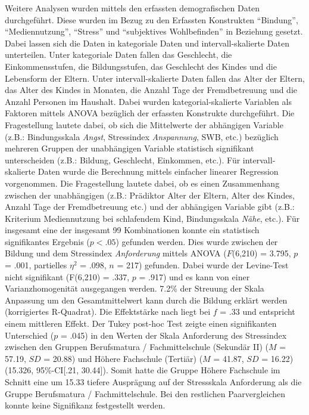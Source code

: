 Weitere Analysen wurden mittels den erfassten demografischen Daten durchgeführt. Diese wurden im Bezug zu den Erfassten Konstrukten \enquote{Bindung}, \enquote{Mediennutzung}, \enquote{Stress} und \enquote{subjektives Wohlbefinden} in Beziehung gesetzt. Dabei lassen sich die Daten in kategoriale Daten und intervall-skalierte Daten unterteilen. Unter kategoriale Daten fallen das Geschlecht, die Einkommensstufen, die Bildungsstufen, das Geschlecht des Kindes und die Lebensform der Eltern. Unter intervall-skalierte Daten fallen das Alter der Eltern, das Alter des Kindes in Monaten, die Anzahl Tage der Fremdbetreuung und die Anzahl Personen im Haushalt. Dabei wurden kategorial-skalierte Variablen als Faktoren mittels ANOVA bezüglich der erfassten Konstrukte durchgeführt. Die Fragestellung lautete dabei, ob sich die Mittelwerte der abhängigen Variable (z.B.: Bindungsskala \textit{Angst}, Stressindex \textit{Anspannung}, SWB, etc.) bezüglich mehreren Gruppen der unabhängigen Variable statistisch signifikant unterscheiden  (z.B.: Bildung, Geschlecht, Einkommen, etc.). Für intervall-skalierte Daten wurde die Berechnung mittels einfacher linearer Regression vorgenommen. Die Fragestellung lautete dabei, ob es einen Zusammenhang zwischen der unabhängigen (z.B.: Prädiktor Alter der Eltern, Alter des Kindes, Anzahl Tage der Fremdbetreuung etc.) und der abhängigen Variable gibt (z.B.: Kriterium Mediennutzung bei schlafendem Kind, Bindungsskala \textit{Nähe}, etc.). Für insgesamt eine der insgesamt 99 Kombinationen konnte ein statistisch signifikantes Ergebnis ($p<.05$) gefunden werden. Dies wurde zwischen der Bildung und dem Stressindex \textit{Anforderung} mittels ANOVA ($F$(6,210) = 3.795, $p$ = .001, partielles $\eta^2$ = .098, $n$ = 217) gefunden. Dabei wurde der Levine-Test nicht signifikant (F(6,210) = .337, $p$ = .917) und es kann von einer Varianzhomogenität ausgegangen werden. 7.2\% der Streuung der Skala Anpassung um den Gesamtmittelwert kann durch die Bildung erklärt werden (korrigiertes R-Quadrat). Die Effektstärke nach  liegt bei $f$ = .33 und entspricht einem mittleren Effekt. Der Tukey post-hoc Test zeigte einen signifikanten Unterschied ($p$ = .045) in den Werten der Skala Anforderung des Stressindex zwischen den Gruppen Berufsmatura / Fachmittelschule (Sekundär II) ($M$ = 57.19, $SD$ = 20.88) und Höhere Fachschule (Tertiär) ($M$ = 41.87, $SD$ = 16.22) (15.326, 95\%-CI[.21, 30.44]). Somit hatte die Gruppe Höhere Fachschule im Schnitt eine um 15.33 tiefere Ausprägung auf der Stressskala Anforderung als die Gruppe Berufsmatura / Fachmittelschule. Bei den restlichen Paarvergleichen konnte keine Signifikanz festgestellt werden.

